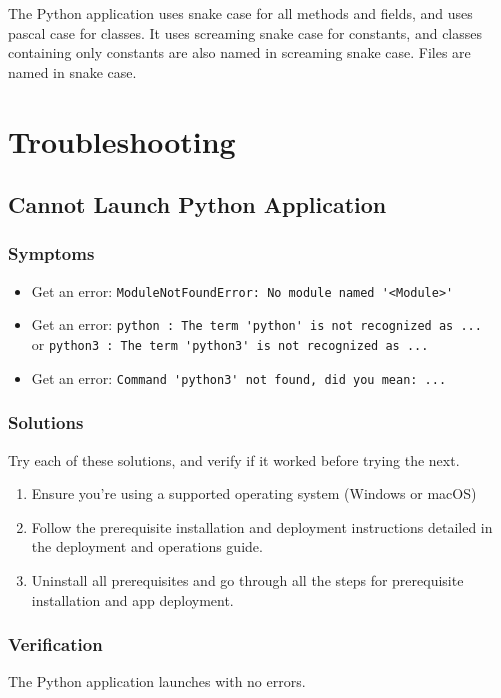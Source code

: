 \documentclass[11pt]{article}
\begin{document}
The Python application uses snake case for all methods and fields, and uses pascal case for classes. It uses screaming snake case for constants, and classes containing only constants are also named in screaming snake case. Files are named in snake case.
\section{Troubleshooting}

\subsection{Cannot Launch Python Application}
\subsubsection{Symptoms}
\begin{itemize}
  \item Get an error: \verb|ModuleNotFoundError: No module named '<Module>'|
  \item Get an error: \verb|python : The term 'python' is not recognized as ...|\\ or \verb|python3 : The term 'python3' is not recognized as ...|
  \item Get an error: \verb|Command 'python3' not found, did you mean: ...|

\end{itemize}
\subsubsection{Solutions}
Try each of these solutions, and verify if it worked before trying the next.
\begin{enumerate}
  \item Ensure you're using a supported operating system (Windows or macOS)
  \item Follow the prerequisite installation and deployment instructions detailed in the deployment and operations guide.
  \item Uninstall all prerequisites and go through all the steps for prerequisite installation and app deployment.
\end{enumerate}

\subsubsection{Verification}
The Python application launches with no errors.
\end{document}
